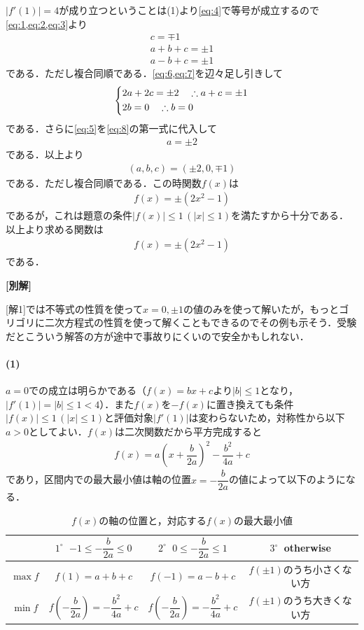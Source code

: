 \documentclass[../../main.tex]{subfiles}
\begin{document}
$|f'(1)|=4$が成り立つということは(1)より\cref{eq:4}で等号が成立するので\cref{eq:1,eq:2,eq:3}より
\begin{align}
  c = \mp 1 \label{eq:5}\\
  a+b+c = \pm 1 \label{eq:6}\\
  a-b+c = \pm 1 \label{eq:7}
\end{align}
である．ただし複合同順である．\cref{eq:6,eq:7}を辺々足し引きして
\begin{align}
  \begin{dcases}
    2a+2c = \pm 2 \quad \therefore a+c = \pm 1 \\
    2b = 0 \quad \therefore b = 0
  \end{dcases}\label{eq:8}
\end{align}
である．さらに\cref{eq:5}を\cref{eq:8}の第一式に代入して
\begin{align}
  a = \pm 2
\end{align}
である．以上より
\begin{align}
  (a,b,c) = (\pm 2,0,\mp 1)
\end{align}
である．ただし複合同順である．この時関数$f(x)$は
\begin{align}
  f(x) = \pm \left(2x^2-1\right)
\end{align}
であるが，これは題意の条件$|f(x)|\le 1\, (|x|\le 1)$を満たすから十分である．
以上より求める関数は
\begin{align}
  f(x) = \pm \left(2x^2-1\right)
\end{align}
である．

{\bf [別解]}

[解1]では不等式の性質を使って$x=0,\pm 1$の値のみを使って解いたが，もっとゴリゴリに二次方程式の性質を使って解くこともできるのでその例も示そう．受験だとこういう解答の方が途中で事故りにくいので安全かもしれない．

\paragraph{(1)}
$a=0$での成立は明らかである（$f(x)=bx+c$より$|b|\le 1$となり，$|f'(1)|=|b|\le 1<4$）．また$f(x)$を$-f(x)$に置き換えても条件$|f(x)|\le 1\, (|x|\le 1)$と評価対象$|f'(1)|$は変わらないため，対称性から以下$a>0$としてよい．$f(x)$は二次関数だから平方完成すると
\begin{align}
  f(x)=a\left(x+\dfrac{b}{2a}\right)^2-\dfrac{b^2}{4a}+c
\end{align}
であり，区間内での最大最小値は軸の位置$x=-\dfrac{b}{2a}$の値によって以下のようになる．
\begin{table}[htb]
  \centering
  \caption{$f(x)$の軸の位置と，対応する$f(x)$の最大最小値}
  \begin{tabular}{c|c|c|c}
    & $1^{\circ} \ $ $-1\le-\dfrac{b}{2a}\le0$ & $2^{\circ} \ $ $0\le-\dfrac{b}{2a}\le1$ & $3^{\circ} \ $ otherwise \\
    \hline
    $\max f$ & $f(1)=a+b+c$ & $f(-1)=a-b+c$ & $f(\pm 1)$のうち小さくない方 \\
    \hline
    $\min f$ & $f\left(-\dfrac{b}{2a}\right)=-\dfrac{b^2}{4a}+c$ & $f\left(-\dfrac{b}{2a}\right)=-\dfrac{b^2}{4a}+c$ & $f(\pm 1)$のうち大きくない方
  \end{tabular}
\end{table}
\end{document}
